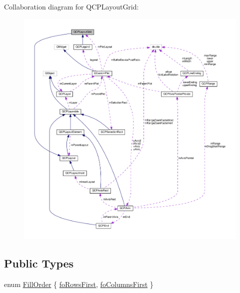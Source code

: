 Collaboration diagram for Q\+C\+P\+Layout\+Grid\+:
\nopagebreak
\begin{figure}[H]
\begin{center}
\leavevmode
\includegraphics[width=350pt]{classQCPLayoutGrid__coll__graph}
\end{center}
\end{figure}
\subsection*{Public Types}
\begin{DoxyCompactItemize}
\item 
enum \hyperlink{classQCPLayoutGrid_a7d49ee08773de6b2fd246edfed353cca}{Fill\+Order} \{ \hyperlink{classQCPLayoutGrid_a7d49ee08773de6b2fd246edfed353ccaa0202730954e26c474cc820164aedce3e}{fo\+Rows\+First}, 
\hyperlink{classQCPLayoutGrid_a7d49ee08773de6b2fd246edfed353ccaac4cb4b796ec4822d5894b47b51627fb3}{fo\+Columns\+First}
 \}
\end{DoxyCompactItemize}
